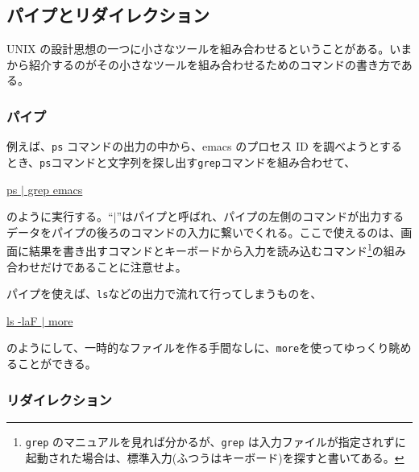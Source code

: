 

\subsection{パイプとリダイレクション}

UNIX の設計思想の一つに小さなツールを組み合わせるということがある。いまから紹介するのがその小さなツールを組み合わせるためのコマンドの書き方である。

\subsubsection{パイプ}
例えば、{\tt ps} コマンドの出力の中から、emacs のプロセス ID を調べようとするとき、{\tt ps}コマンドと文字列を探し出す{\tt grep}コマンドを組み合わせて、
\begin{commandline2}
\prompt \underline{ps $|$ grep emacs}
\end{commandline2} \noindent
のように実行する。``{\tt $|$}''はパイプと呼ばれ、パイプの左側のコマンドが出力するデータをパイプの後ろのコマンドの入力に繋いでくれる。ここで使えるのは、画面に結果を書き出すコマンドとキーボードから入力を読み込むコマンド\footnote{{\tt grep} のマニュアルを見れば分かるが、{\tt grep} は入力ファイルが指定されずに起動された場合は、標準入力(ふつうはキーボード)を探すと書いてある。}の組み合わせだけであることに注意せよ。

パイプを使えば、{\tt ls}などの出力で流れて行ってしまうものを、
\begin{commandline2}
\prompt \underline{ls -laF $|$ more}
\end{commandline2} \noindent
のようにして、一時的なファイルを作る手間なしに、{\tt more}を使ってゆっくり眺めることができる。

\subsubsection{リダイレクション}

